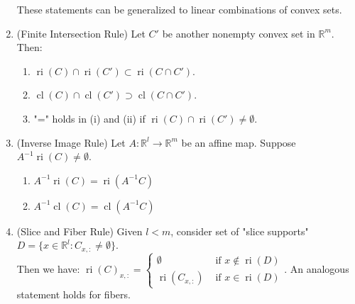 \begin{prop}
\begin{enumerate}[label=(\alph*)]
\begin{enumerate}[label=(\roman*)]
		      \end{enumerate}
		      These statements can be generalized to linear combinations of convex sets.
		\item (Finite Intersection Rule) Let $C'$ be another nonempty convex set in $\mathbb{R}^m$. Then:
		      \begin{enumerate}[label=(\roman*)]
			      \item $\operatorname{ri}(C)\cap\operatorname{ri}(C')\subset\operatorname{ri}(C\cap C')$.
			      \item $\operatorname{cl}(C)\cap\operatorname{cl}(C')\supset\operatorname{cl}(C\cap C')$.
			      \item "=" holds in (i) and (ii) if $\operatorname{ri}(C)\cap\operatorname{ri}(C')\neq\emptyset$.
		      \end{enumerate}
		\item (Inverse Image Rule) Let $A:\mathbb{R}^l\to \mathbb{R}^m$ be an affine map. Suppose $A^{-1}\operatorname{ri}(C)\neq \emptyset$.
		      \begin{enumerate}[label=(\roman*)]
			      \item $A^{-1}\operatorname{ri}(C)=\operatorname{ri}(A^{-1}C)$
			      \item $A^{-1}\operatorname{cl}(C)=\operatorname{cl}(A^{-1}C)$
		      \end{enumerate}
		\item (Slice and Fiber Rule) Given $l< m$, consider set of "slice supports" $D=\{x\in \mathbb{R}^l:C_{x,:}\neq\emptyset\}$.\\
		      Then we have:
		      $\operatorname{ri}(C)_{x,:}=
			      \begin{cases}
				      \emptyset                  & \text{ if }x\notin \operatorname{ri}(D) \\
				      \operatorname{ri}(C_{x,:}) & \text{ if }x\in \operatorname{ri}(D)
			      \end{cases}$. An analogous statement holds for fibers.
	\end{enumerate}
\end{prop}

